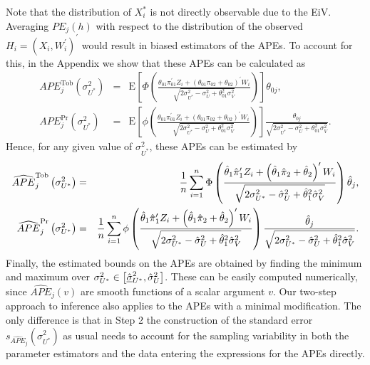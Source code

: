\documentclass[11pt]{article}
\begin{document}
Note that the distribution of $X_{i}^{\ast }$ is not directly observable due
to the EiV. Averaging $PE_{j}\left( h\right) $ with respect to the
distribution of the observed $H_{i}=\left( X_{i},W_{i}^{\prime }\right)
^{\prime }$ would result in biased estimators of the APEs. To account for
this, in the Appendix we show that these APEs can be calculated as%
\begin{eqnarray}
APE_{j}^{\text{Tob}}\left( \sigma _{U^{\ast }}^{2}\right) &=&\mathrm{E}\left[
\Phi \left( \frac{\theta _{01}\pi _{01}^{\prime }Z_{i}+\left( \theta
_{01}\pi _{02}+\theta _{02}\right) ^{\prime }W_{i}}{\sqrt{2\sigma _{U^{\ast
}}^{2}-\sigma _{U}^{2}+\theta _{01}^{2}\sigma _{V}^{2}}}\right) \right]
\theta _{0j},  \label{eq:true APE Tobit} \\
APE_{j}^{\Pr }\left( \sigma _{U^{\ast }}^{2}\right) &=&\mathrm{E}\left[ \phi
\left( \frac{\theta _{01}\pi _{01}^{\prime }Z_{i}+\left( \theta _{01}\pi
_{02}+\theta _{02}\right) ^{\prime }W_{i}}{\sqrt{2\sigma _{U^{\ast
}}^{2}-\sigma _{U}^{2}+\theta _{01}^{2}\sigma _{V}^{2}}}\right) \right] 
\frac{\theta _{0j}}{\sqrt{2\sigma _{U^{\ast }}^{2}-\sigma _{U}^{2}+\theta
_{01}^{2}\sigma _{V}^{2}}}.  \label{eq:true APE Probit}
\end{eqnarray}%
Hence, for any given value of $\sigma _{U^{\ast }}^{2}$, these APEs can be
estimated by%
\begin{eqnarray*}
\widehat{APE}_{j}^{\text{Tob}}\left( \sigma _{U^{\ast }}^{2}\right) &=&\frac{%
1}{n}\sum_{i=1}^{n}\Phi \left( \frac{\hat{\theta}_{1}\hat{\pi}_{1}^{\prime
}Z_{i}+\left( \hat{\theta}_{1}\hat{\pi}_{2}+\hat{\theta}_{2}\right) ^{\prime
}W_{i}}{\sqrt{2\sigma _{U^{\ast }}^{2}-\hat{\sigma}_{U}^{2}+\hat{\theta}%
_{1}^{2}\hat{\sigma}_{V}^{2}}}\right) \hat{\theta}_{j}, \\
\widehat{APE}_{j}^{\Pr }\left( \sigma _{U^{\ast }}^{2}\right) &=&\frac{1}{n}%
\sum_{i=1}^{n}\phi \left( \frac{\hat{\theta}_{1}\hat{\pi}_{1}^{\prime
}Z_{i}+\left( \hat{\theta}_{1}\hat{\pi}_{2}+\hat{\theta}_{2}\right) ^{\prime
}W_{i}}{\sqrt{2\sigma _{U^{\ast }}^{2}-\hat{\sigma}_{U}^{2}+\hat{\theta}%
_{1}^{2}\hat{\sigma}_{V}^{2}}}\right) \frac{\hat{\theta}_{j}}{\sqrt{2\sigma
_{U^{\ast }}^{2}-\hat{\sigma}_{U}^{2}+\hat{\theta}_{1}^{2}\hat{\sigma}%
_{V}^{2}}}.
\end{eqnarray*}%
Finally, the estimated bounds on the APEs are obtained by finding the
minimum and maximum over $\sigma _{U^{\ast }}^{2}\in \left[ \hat{\underline{%
\sigma }}_{U^{\ast }}^{2},\hat{\sigma}_{U}^{2}\right] $. These can be easily
computed numerically, since $\widehat{APE}_{j}\left( v\right) $ are smooth
functions of a scalar argument $v$. Our two-step approach to inference also
applies to the APEs with a minimal modification. The only difference is that
in Step 2 the construction of the standard error $s_{\widehat{APE}%
_{j}}\left( \sigma _{U^{\ast }}^{2}\right) $ as usual needs to account for
the sampling variability in both the parameter estimators and the data
entering the expressions for the APEs directly.
\end{document}
